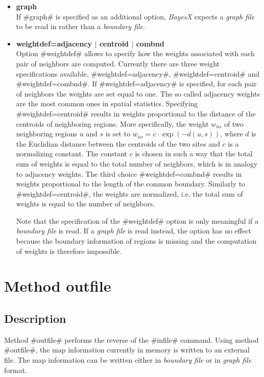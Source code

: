 \begin{itemize}
\item {\bf graph} \\
If #graph# is specified as an additional option, {\em BayesX}
expects a {\em graph file} to be read in rather than a {\em
boundary file}.
\item {\bf weightdef=adjacency $|$ centroid  $|$ combnd } \\
\label{weightsmap} Option #weightdef# allows to specify how the
weights associated with each pair of neighbors are computed.
Currently there are three weight specifications available,
#weightdef=adjacency#, #weightdef=centroid# and
#weightdef=combnd#. If #weightdef=adjacency# is specified, for
each pair of neighbors the weights are set equal to one. The so
called adjacency weights are the most common ones in spatial
statistics. Specifying #weightdef=centroid# results in weights
proportional to the distance of the centroids of neighboring
regions. More specifically, the weight $w_{us}$ of two neighboring
regions $u$ and $s$ is set to $w_{us} = c \cdot \exp(-d(u,s))$,
where $d$ is the Euclidian distance between the centroids of the
two sites and $c$ is a normalizing constant. The constant $c$ is
chosen in such a way that the total sum of weights is equal to the
total number of neighbors, which is in analogy to adjacency
weights. The third choice #weightdef=combnd# results in weights
proportional to the length of the common boundary. Similarly to
#weightdef=centroid#, the weights are normalized, i.e. the total
sum of weights is equal to the number of neighbors.

Note that the specification of the #weightdef# option is only
meaningful if a {\em boundary file} is read. If a {\em graph file}
is read  instead, the option has no effect because the boundary
information of regions is missing and  the computation of weights
is therefore impossible.
\end{itemize}



\section{Method outfile}
\label{mapoutfile} 

\subsection*{Description}

Method #outfile# performs the reverse of the #infile# command.
Using method #outfile#, the map information currently in memory is
written to an external file. The map information can be written
either in {\em boundary file} or in {\em graph file} format.


